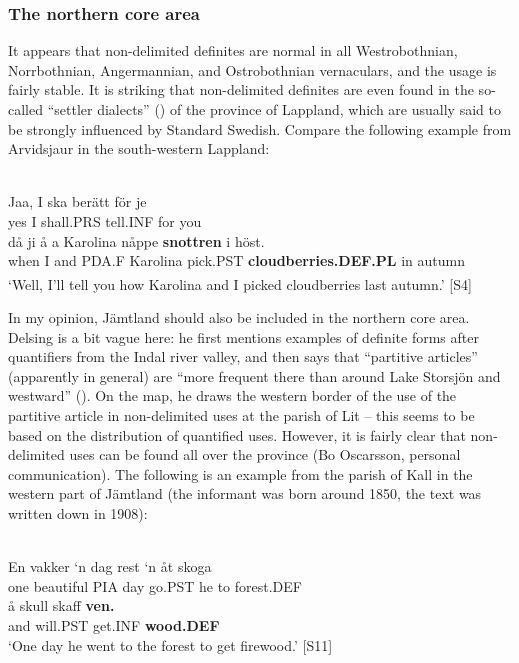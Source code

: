 \subsubsection{The northern core area}
It appears that non-delimited definites are normal in all Westrobothnian, Norrbothnian, Angermannian, and Ostrobothnian vernaculars, and the usage is fairly stable. It is striking that non-delimited definites are even found in the so-called “settler dialects” () of the province of Lappland, which are usually said to be strongly influenced by Standard Swedish. Compare the following example from Arvidsjaur in the south-western Lappland:

\ea \label{} 
\\
\gll Jaa,  I  ska  berätt  för  je\\
yes  I  shall.PRS  tell.INF  for  you\\
\gll då  ji  å  a  Karolina  nåppe  \textbf{snottren} i  höst.\\
when  I  and  PDA.F  Karolina  pick.PST  \textbf{cloudberries.DEF.PL} in  autumn\\
\glt ‘Well, I’ll tell you how Karolina and I picked cloudberries last autumn.’\textsuperscript{ }[S4]

\z

In my opinion, Jämtland should also be included in the northern core area. Delsing is a bit vague here: he first mentions examples of definite forms after quantifiers from the Indal river valley, and then says that “partitive articles” (apparently in general) are “more frequent there than around Lake Storsjön and westward” (\citet[19]{Delsing2003a}). On the map, he draws the western border of the use of the partitive article in non-delimited uses at the parish of Lit – this seems to be based on the distribution of quantified uses. However, it is fairly clear that non-delimited uses can be found all over the province (Bo Oscarsson, personal communication). The following is an example from the parish of Kall in the western part of Jämtland (the informant was born around 1850, the text was written down in 1908):

\ea \label{} 
\\
\gll En  vakker  ‘n  dag  rest  ‘n  åt  skoga\\
one  beautiful  PIA  day  go.PST  he  to  forest.DEF\\
\gll å  skull  skaff  \textbf{ven.}\\
and  will.PST  get.INF  \textbf{wood.DEF}\\
\glt ‘One day he went to the forest to get firewood.’ [S11]

